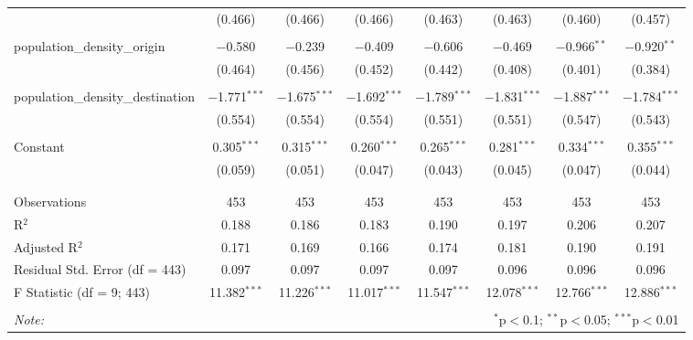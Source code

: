 \begin{table}[!htbp]
\begin{tabular}{@{\extracolsep{5pt}}lccccccc}
  & (0.466) & (0.466) & (0.466) & (0.463) & (0.463) & (0.460) & (0.457) \\ 
  & & & & & & & \\ 
 population\_density\_origin & $-$0.580 & $-$0.239 & $-$0.409 & $-$0.606 & $-$0.469 & $-$0.966$^{**}$ & $-$0.920$^{**}$ \\ 
  & (0.464) & (0.456) & (0.452) & (0.442) & (0.408) & (0.401) & (0.384) \\ 
  & & & & & & & \\ 
 population\_density\_destination & $-$1.771$^{***}$ & $-$1.675$^{***}$ & $-$1.692$^{***}$ & $-$1.789$^{***}$ & $-$1.831$^{***}$ & $-$1.887$^{***}$ & $-$1.784$^{***}$ \\ 
  & (0.554) & (0.554) & (0.554) & (0.551) & (0.551) & (0.547) & (0.543) \\ 
  & & & & & & & \\ 
 Constant & 0.305$^{***}$ & 0.315$^{***}$ & 0.260$^{***}$ & 0.265$^{***}$ & 0.281$^{***}$ & 0.334$^{***}$ & 0.355$^{***}$ \\ 
  & (0.059) & (0.051) & (0.047) & (0.043) & (0.045) & (0.047) & (0.044) \\ 
  & & & & & & & \\ 
\hline \\[-1.8ex] 
Observations & 453 & 453 & 453 & 453 & 453 & 453 & 453 \\ 
R$^{2}$ & 0.188 & 0.186 & 0.183 & 0.190 & 0.197 & 0.206 & 0.207 \\ 
Adjusted R$^{2}$ & 0.171 & 0.169 & 0.166 & 0.174 & 0.181 & 0.190 & 0.191 \\ 
Residual Std. Error (df = 443) & 0.097 & 0.097 & 0.097 & 0.097 & 0.096 & 0.096 & 0.096 \\ 
F Statistic (df = 9; 443) & 11.382$^{***}$ & 11.226$^{***}$ & 11.017$^{***}$ & 11.547$^{***}$ & 12.078$^{***}$ & 12.766$^{***}$ & 12.886$^{***}$ \\ 
\hline 
\hline \\[-1.8ex] 
\textit{Note:}  & \multicolumn{7}{r}{$^{*}$p$<$0.1; $^{**}$p$<$0.05; $^{***}$p$<$0.01} \\ 
\end{tabular} 
\end{table} 
